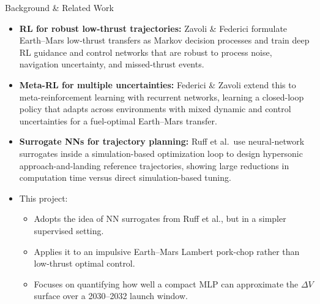\documentclass[aspectratio=169]{beamer}
\begin{document}
	\begin{frame}{Background \& Related Work}
		\begin{itemize}
			\item \textbf{RL for robust low-thrust trajectories:}
			Zavoli \& Federici formulate Earth--Mars low-thrust transfers as Markov decision processes and train deep RL guidance and control networks that are robust to process noise, navigation uncertainty, and missed-thrust events.
			\item \textbf{Meta-RL for multiple uncertainties:}
			Federici \& Zavoli extend this to meta-reinforcement learning with recurrent networks, learning a closed-loop policy that adapts across environments with mixed dynamic and control uncertainties for a fuel-optimal Earth--Mars transfer.
			\item \textbf{Surrogate NNs for trajectory planning:}
			Ruff et al.\ use neural-network surrogates inside a simulation-based optimization loop to design hypersonic approach-and-landing reference trajectories, showing large reductions in computation time versus direct simulation-based tuning.
			\item This project:
			\begin{itemize}
				\item Adopts the idea of NN surrogates from Ruff et al., but in a simpler supervised setting.
				\item Applies it to an impulsive Earth--Mars Lambert pork-chop rather than low-thrust optimal control.
				\item Focuses on quantifying how well a compact MLP can approximate the $\Delta V$ surface over a 2030--2032 launch window.
			\end{itemize}
		\end{itemize}
	\end{frame}
	
\end{document}
